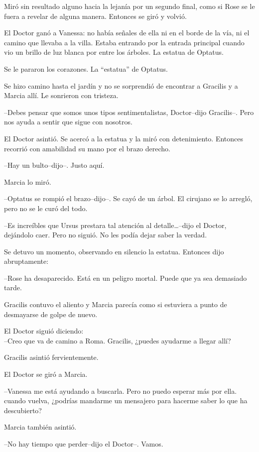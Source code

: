 Miró sin resultado alguno hacia la lejanía por un segundo final, como si
Rose se le fuera a revelar de alguna manera. Entonces se giró y volvió.

El Doctor ganó a Vanessa: no había señales de ella ni en el borde de la
vía, ni el camino que llevaba a la villa. Estaba entrando por la entrada
principal cuando vio un brillo de luz blanca por entre los árboles. La
estatua de Optatus.

Se le pararon los corazones. La ``estatua'' de Optatus.

Se hizo camino hasta el jardín y no se sorprendió de encontrar a
Gracilis y a Marcia allí. Le sonrieron con tristeza.

--Debes pensar que somos unos tipos sentimentalistas, Doctor--dijo
Gracilis--. Pero nos ayuda a sentir que sigue con nosotros.

El Doctor asintió. Se acercó a la estatua y la miró con detenimiento.
Entonces recorrió con amabilidad su mano por el brazo derecho.

--Hay un bulto--dijo--. Justo aquí.

Marcia lo miró.

--Optatus se rompió el brazo--dijo--. Se cayó de un árbol. El cirujano
se lo arregló, pero no se le curó del todo.

--Es increíbles que Ursus prestara tal atención al detalle\ldots{}--dijo
el Doctor, dejándolo caer. Pero no siguió. No les podía dejar saber la
verdad.

Se detuvo un momento, observando en silencio la estatua. Entonces dijo
abruptamente:

--Rose ha desaparecido. Está en un peligro mortal. Puede que ya sea
demasiado tarde.

Gracilis contuvo el aliento y Marcia parecía como si estuviera a punto
de desmayarse de golpe de nuevo.

El Doctor siguió diciendo:\\--Creo que va de camino a Roma. Gracilis,
¿puedes ayudarme a llegar allí?

Gracilis asintió fervientemente.

El Doctor se giró a Marcia.

--Vanessa me está ayudando a buscarla. Pero no puedo esperar más por
ella. cuando vuelva, ¿podrías mandarme un mensajero para hacerme saber
lo que ha descubierto?

Marcia también asintió.

--No hay tiempo que perder--dijo el Doctor--. Vamos.

